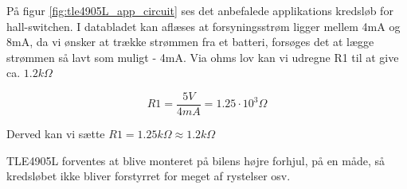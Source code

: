 På figur \ref{fig:tle4905L_app_circuit} ses det anbefalede applikations kredsløb for hall-switchen. I databladet kan aflæses at forsyningsstrøm ligger mellem 4mA og 8mA, da vi ønsker at trække strømmen fra et batteri, forsøges det at lægge strømmen så lavt som muligt - 4mA. Via ohms lov kan vi udregne R1 til at give ca. $1.2k\Omega$

\begin{equation}
R1 = \dfrac{5V}{4mA} = 1.25\cdot 10^3 \Omega
\end{equation}

Derved kan vi sætte $R1 = 1.25k\Omega \approx 1.2k\Omega$

TLE4905L forventes at blive monteret på bilens højre forhjul, på en måde, så kredsløbet ikke bliver forstyrret for meget af rystelser osv. 